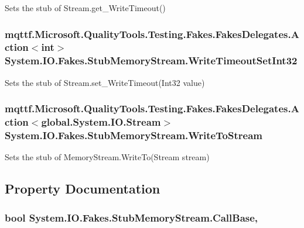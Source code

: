 Sets the stub of Stream.\-get\-\_\-\-Write\-Timeout()

\hypertarget{class_system_1_1_i_o_1_1_fakes_1_1_stub_memory_stream_a3ddedc495d8a60effa2571cf1ad6cbce}{
\subsubsection[{Write\-Timeout\-Set\-Int32}]{\setlength{\rightskip}{0pt plus 5cm}mqttf.\-Microsoft.\-Quality\-Tools.\-Testing.\-Fakes.\-Fakes\-Delegates.\-Action$<$int$>$ System.\-I\-O.\-Fakes.\-Stub\-Memory\-Stream.\-Write\-Timeout\-Set\-Int32}}\label{class_system_1_1_i_o_1_1_fakes_1_1_stub_memory_stream_a3ddedc495d8a60effa2571cf1ad6cbce}


Sets the stub of Stream.\-set\-\_\-\-Write\-Timeout(\-Int32 value)

\hypertarget{class_system_1_1_i_o_1_1_fakes_1_1_stub_memory_stream_a0887d5f5cb9a7dbbe2ac888ceec4f5d1}{
\subsubsection[{Write\-To\-Stream}]{\setlength{\rightskip}{0pt plus 5cm}mqttf.\-Microsoft.\-Quality\-Tools.\-Testing.\-Fakes.\-Fakes\-Delegates.\-Action$<$global.\-System.\-I\-O.\-Stream$>$ System.\-I\-O.\-Fakes.\-Stub\-Memory\-Stream.\-Write\-To\-Stream}}\label{class_system_1_1_i_o_1_1_fakes_1_1_stub_memory_stream_a0887d5f5cb9a7dbbe2ac888ceec4f5d1}


Sets the stub of Memory\-Stream.\-Write\-To(\-Stream stream)



\subsection{Property Documentation}
\hypertarget{class_system_1_1_i_o_1_1_fakes_1_1_stub_memory_stream_a2ac31444704a7f4f57c65eca419bf643}{
\subsubsection[{Call\-Base}]{\setlength{\rightskip}{0pt plus 5cm}bool System.\-I\-O.\-Fakes.\-Stub\-Memory\-Stream.\-Call\-Base\hspace{0.3cm}{\ttfamily [get]}, {\ttfamily [set]}}}\label{class_system_1_1_i_o_1_1_fakes_1_1_stub_memory_stream_a2ac31444704a7f4f57c65eca419bf643}


